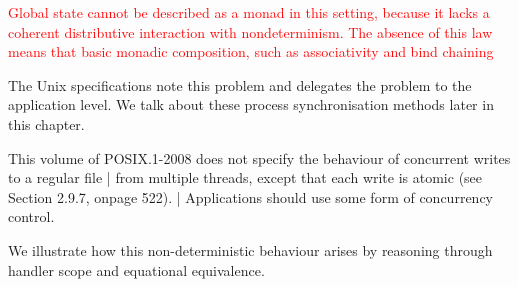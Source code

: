 \documentclass[logo,bsc,singlespacing,parskip]{infthesis}
\begin{document}
\textcolor{red}{Global state cannot be described as a monad in this setting, because it lacks a coherent distributive interaction with nondeterminism. The absence of this law means that basic monadic composition, such as associativity and bind chaining}

The Unix specifications note this problem and delegates the problem to the application level. We talk about these process synchronisation methods later in this chapter.


\begin{tcolorbox}[colback=gray!10, colframe=gray!60, sharp corners, boxrule=0.5pt, title={POSIX Base Specifications, Issue 7, p.2316}]
 This volume of POSIX.1-2008 does not specify the behaviour of concurrent writes to a regular file |
 from multiple threads, except that each write is atomic (see Section 2.9.7, onpage 522). |
 Applications should use some form of concurrency control.
\end{tcolorbox}

We illustrate how this non-deterministic behaviour arises by reasoning through handler scope and equational equivalence.
\end{document}
